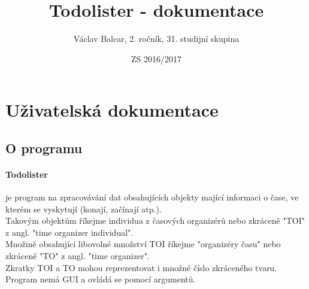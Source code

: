 \documentclass[11pt]{article}
\title{Todolister - dokumentace}
\date{ZS 2016/2017}
\author{Václav Balcar, 2. ročník, 31. studijní skupina}
\begin{document}
\maketitle
{}
\newpage
{}
\tableofcontents
\newpage


\section{Uživatelská dokumentace}
\subsection{O programu}
\paragraph{Todolister} je program na zpracovávání dat obsahujících objekty mající informaci o čase, ve kterém se vyskytují (konají, začínají atp.).\\
Takovým objektům říkejme individua z časových organizérů nebo zkráceně "TOI" z angl. "time organizer individual".\\
Množině obsahující libovolné množství TOI říkejme "organizéry času" nebo zkráceně "TO" z angl. "time organizer".\\
Zkratky TOI a TO mohou reprezentovat i množné číslo zkráceného tvaru.\\
Program nemá GUI a ovládá se pomocí argumentů.
\end{document}
